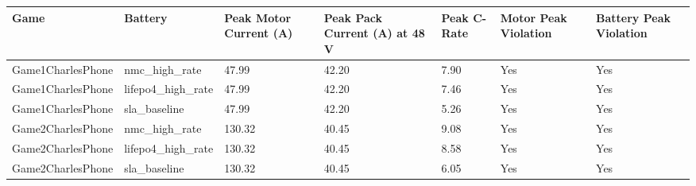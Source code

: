 \begin{tabular}{lllllll}
\toprule
Game & Battery & Peak Motor Current (A) & Peak Pack Current (A) at 48 V & Peak C-Rate & Motor Peak Violation & Battery Peak Violation \\
\midrule
Game1CharlesPhone & nmc\_high\_rate & 47.99 & 42.20 & 7.90 & Yes & Yes \\
Game1CharlesPhone & lifepo4\_high\_rate & 47.99 & 42.20 & 7.46 & Yes & Yes \\
Game1CharlesPhone & sla\_baseline & 47.99 & 42.20 & 5.26 & Yes & Yes \\
Game2CharlesPhone & nmc\_high\_rate & 130.32 & 40.45 & 9.08 & Yes & Yes \\
Game2CharlesPhone & lifepo4\_high\_rate & 130.32 & 40.45 & 8.58 & Yes & Yes \\
Game2CharlesPhone & sla\_baseline & 130.32 & 40.45 & 6.05 & Yes & Yes \\
\bottomrule
\end{tabular}
